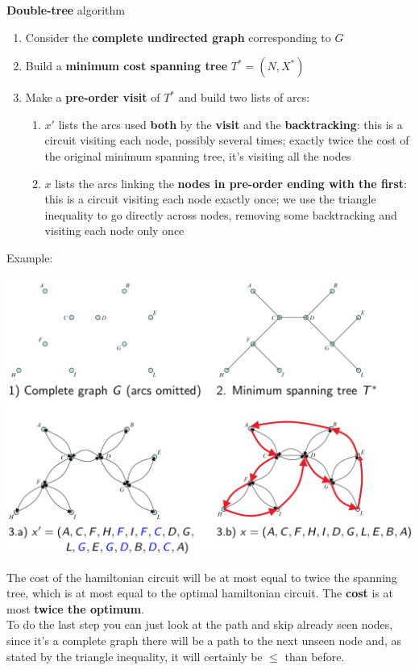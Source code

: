 \textbf{Double-tree} algorithm
\begin{enumerate}
	\item Consider the \textbf{complete undirected graph} corresponding to $G$
	\item Build a \textbf{minimum cost spanning tree} $T^\ast = (N, X^\ast)$
	\item Make a \textbf{pre-order visit} of $T^\ast$ and build two lists of arcs:
	\begin{enumerate}[label=\alph*.]
		\item $x'$ lists the arcs used \textbf{both} by the \textbf{visit} and the \textbf{backtracking}: this is a circuit visiting each node, possibly several times; exactly twice the cost of the original minimum spanning tree, it's visiting all the nodes
		\item $x$ lists the arcs linking the \textbf{nodes in pre-order ending with the first}: this is a circuit visiting each node exactly once; we use the triangle inequality to go directly across nodes, removing some backtracking and visiting each node only once
	\end{enumerate}
\end{enumerate}

Example:
\begin{center}
	\includegraphics[width=0.8\columnwidth]{img/TSTTI1}
\end{center}

\newpage

The cost of the hamiltonian circuit will be at most equal to twice the spanning tree, which is at most equal to the optimal hamiltonian circuit. The \textbf{cost} is at most \textbf{twice the optimum}. \\

To do the last step you can just look at the path and skip already seen nodes, since it's a complete graph there will be a path to the next unseen node and, as stated by the triangle inequality, it will certainly be $\leq$ than before. \\

